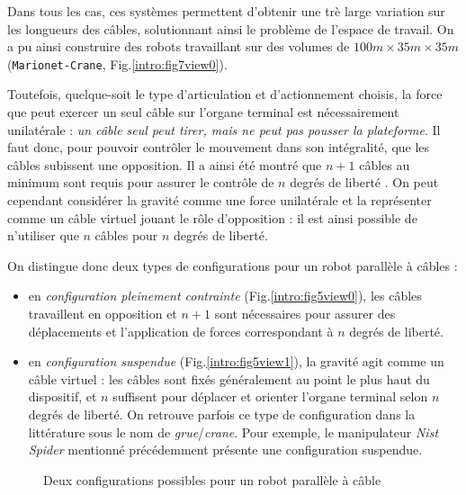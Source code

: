 Dans tous les cas, ces systèmes permettent d'obtenir une trè large variation sur les longueurs des câbles, solutionnant ainsi le problème de l'espace de travail. On a pu ainsi construire des robots travaillant sur des volumes de $100m\times35m\times35m$ ({\tt Marionet-Crane}, Fig.\ref{intro:fig7view0}).

Toutefois, quelque-soit le type d'articulation et d'actionnement choisis, la force que peut exercer un seul câble sur l'organe terminal est nécessairement unilatérale : {\em un câble seul peut tirer, mais ne peut pas pousser la plateforme}. Il faut donc, pour pouvoir contrôler le mouvement dans son intégralité, que les câbles subissent une opposition. Il a ainsi été montré que $n+1$ câbles au minimum sont requis pour assurer le contrôle de $n$ degrés de liberté \cite{1994:Ming.Higuchi}. On peut cependant considérer la gravité comme une force unilatérale et la représenter comme un câble virtuel jouant le rôle d'opposition : il est ainsi possible de n'utiliser que $n$ câbles pour $n$ degrés de liberté.

On distingue donc deux types de configurations pour un robot parallèle à câbles :
\begin{itemize}
 \item en {\it configuration pleinement contrainte} (Fig.\ref{intro:fig5view0}), les câbles travaillent en opposition et $n+1$ sont nécessaires pour assurer des déplacements et l'application de forces correspondant à $n$ degrés de liberté.
 \item en {\it configuration suspendue} (Fig.\ref{intro:fig5view1}), la gravité agit comme un câble virtuel : les câbles sont fixés généralement au point le plus haut du dispositif, et $n$ suffisent pour déplacer et orienter l'organe terminal selon $n$ degrés de liberté. On retrouve parfois ce type de configuration dans la littérature sous le nom de {\it grue}/{\it crane}. Pour exemple, le manipulateur {\it Nist Spider} \cite{1992:Albus.Bostelman.ea} mentionné précédemment présente une configuration suspendue.
\end{itemize}

\begin{figure}[!ht]
  \centering
      \hfill
    \caption{\footnotesize Deux configurations possibles pour un robot parallèle à câble}
\label{intro:fig5}
\end{figure}

